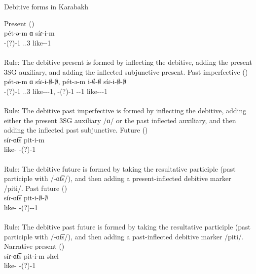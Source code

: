 \begin{exe}
	\ex Debitive forms in Karabakh \label{sent:Karabakh:morpho:verb:Debitive}
	\begin{xlist}
		\ex Present ()\\ \gll 
		p\'et-ə-m ɑ s\'iɾ-i-m \\ 
		{\deb}-{\thgloss}(?)-1{\sg} {\aux}.{\prs}.3{\sg} like-{\thgloss}-1{\sg} \\
		\trans {} \\Rule: The debitive present is formed by inflecting the debitive, adding the present 3SG auxiliary, and adding the inflected subjunctive present. 
		\ex Past imperfective  ()\\ \gll 
		p\'et-ə-m ɑ s\'iɾ-i-$\emptyset$-$\emptyset$, p\'et-ə-m i-$\emptyset$-$\emptyset$ s\'iɾ-i-$\emptyset$-$\emptyset$ \\ 
		{\deb}-{\thgloss}(?)-1{\sg} {\aux}.{\prs}.3{\sg} like-{\thgloss}-{\pst}-1{\sg}, {\deb}-{\thgloss}(?)-1{\sg} {\aux}-{\pst}-1{\sg} like-{\thgloss}-{\pst}-1{\sg} \\
		\trans {} \\
		Rule: The debitive past imperfective is formed by inflecting the debitive, adding either the present 3SG auxiliary /ɑ/ or the past inflected auxiliary, and then adding the inflected past subjunctive. 
		\ex Future  ()\\ \gll 
		s\'iɾ-ɑt͡s pit-i-m \\ 
		like-{\rptcp} {\deb}-{\thgloss}(?)-1{\sg}\\ 
		\trans {} \\
		Rule: The debitive future is formed by taking the resultative participle (past participle with /-ɑt͡s/), and then adding a present-inflected debitive marker /piti/. 
		\ex Past future  ()\\ \gll 
		s\'iɾ-ɑt͡s pit-i-$\emptyset$-$\emptyset$ \\ 
		like-{\rptcp} {\deb}-{\thgloss}(?)-{\pst}-1{\sg} \\ 
		\trans {}\\
		Rule: The debitive past future is formed by taking the resultative participle (past participle with /-ɑt͡s/), and then adding a past-inflected debitive marker /piti/.
		\ex Narrative present  ()\\ \gll 
		s\'iɾ-ɑt͡s pit-i-m əlæl\\ 
		like-{\rptcp} {\deb}-{\thgloss}(?)-1{\sg} {\narr}\\ 

\end{xlist}
\end{exe}
